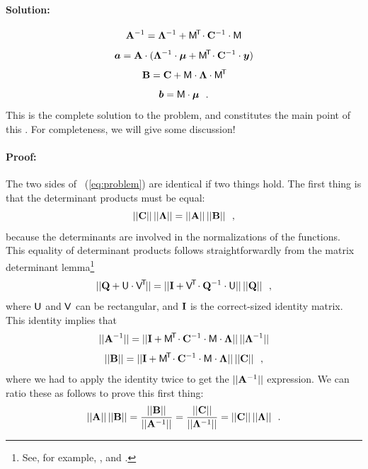 \paragraph{Solution:}
\begin{equation}\label{eq:A}
\mathbf{A}^{-1} = \mathbf{\Lambda}^{-1} + \mathsf{M}^{\!\mathsf{T}\!} \cdot \mathbf{C}^{-1} \cdot \mathsf{M}
\end{equation}
\begin{equation}\label{eq:a}
\boldsymbol{a} = \mathbf{A} \cdot (\mathbf{\Lambda}^{-1} \cdot \boldsymbol{\mu} + \mathsf{M}^{\!\mathsf{T}\!} \cdot \mathbf{C}^{-1} \cdot \boldsymbol{y})
\end{equation}
\begin{equation}\label{eq:B}
\mathbf{B} = \mathbf{C} + \mathsf{M} \cdot \mathbf{\Lambda} \cdot \mathsf{M}^{\!\mathsf{T}\!}
\end{equation}
\begin{equation}\label{eq:b}
\boldsymbol{b} = \mathsf{M} \cdot \boldsymbol{\mu}
~~.
\end{equation}
This is the complete solution to the problem, and constitutes the main point
of this \documentname.
For completeness, we will give some discussion!

\paragraph{Proof:}
The two sides of \equationname~(\ref{eq:problem}) are identical if two things
hold.
The first thing is that the determinant products must be equal:
\begin{equation}
||\mathbf{C}||\,||\mathbf{\Lambda}|| = ||\mathbf{A}||\,||\mathbf{B}||
~~,
\end{equation}
because the determinants are involved in the normalizations of the
functions.
This equality of determinant products follows straightforwardly from
the matrix determinant lemma\footnote{See, for example, \cite{Wiki:MDL}, and \cite{Harville:2011}.}
\begin{equation}\label{eq:detlemma}
||\mathbf{Q} + \mathsf{U}\cdot\mathsf{V}^{\!\mathsf{T}\!}|| = ||\mathbf{I} + \mathsf{V}^{\!\mathsf{T}\!}\cdot\mathbf{Q}^{-1}\cdot\mathsf{U}||\,||\mathbf{Q}||
~~,
\end{equation}
where $\mathsf{U}$ and $\mathsf{V}$ can be rectangular, and $\mathbf{I}$ is the correct-sized identity matrix.
This identity implies that
\begin{equation}
||\mathbf{A}^{-1}|| = ||\mathbf{I} + \mathsf{M}^{\!\mathsf{T}\!}\cdot\mathbf{C}^{-1}\cdot\mathsf{M}\cdot\mathbf{\Lambda}||\,||\mathbf{\Lambda}^{-1}||
\end{equation}
\begin{equation}
||\mathbf{B}||     = ||\mathbf{I} + \mathsf{M}^{\!\mathsf{T}\!}\cdot\mathbf{C}^{-1}\cdot\mathsf{M}\cdot\mathbf{\Lambda}||\,||\mathbf{C}||
~~,
\end{equation}
where we had to apply the identity twice to get the $||\mathbf{A}^{-1}||$ expression.
We can ratio these as follows to prove this first thing:
\begin{equation}
||\mathbf{A}||\,||\mathbf{B}||
 = \frac{||\mathbf{B}||}{||\mathbf{A}^{-1}||}
 = \frac{||\mathbf{C}||}{||\mathbf{\Lambda}^{-1}||}
 = ||\mathbf{C}||\,||\mathbf{\Lambda}||
~~.
\end{equation}

